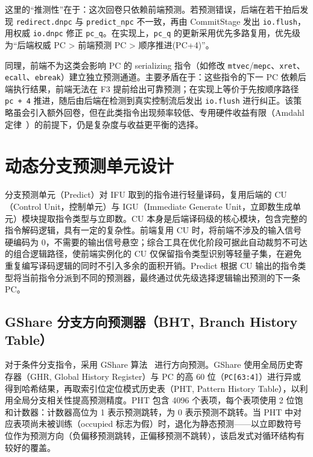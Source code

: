 这里的“推测性”在于：这次回卷只依赖前端预测。若预测错误，后端在若干拍后发现 \lstinline|redirect.dnpc| 与 \lstinline|predict_npc| 不一致，再由 CommitStage 发出 \lstinline|io.flush|，用权威 \lstinline|io.dnpc| 修正 \lstinline|pc_q|。在实现上，\lstinline|pc_q| 的更新采用优先多路复用，优先级为“后端权威 PC > 前端预测 PC > 顺序推进(PC+4)”。

同理，前端不为这类会影响 PC 的 serializing 指令（如修改 \lstinline|mtvec|/\lstinline|mepc|、\lstinline|xret|、\lstinline|ecall|、\lstinline|ebreak|）建立独立预测通道。主要矛盾在于：这些指令的下一 PC 依赖后端执行结果，前端无法在 F3 提前给出可靠预测；在实现上等价于先按顺序路径 \lstinline|pc + 4| 推进，随后由后端在检测到真实控制流后发出 \lstinline|io.flush| 进行纠正。该策略虽会引入额外回卷，但在此类指令出现频率较低、专用硬件收益有限（Amdahl 定律~\cite{amdahl1967validity}）的前提下，仍是复杂度与收益更平衡的选择。

\section{动态分支预测单元设计}\label{sec:predict}

分支预测单元（Predict）对 IFU 取到的指令进行轻量译码，复用后端的 CU（Control Unit，控制单元）与 IGU（Immediate Generate Unit，立即数生成单元）模块提取指令类型与立即数。CU 本身是后端译码级的核心模块，包含完整的指令解码逻辑，具有一定的复杂性。前端复用 CU 时，将前端不涉及的输入信号硬编码为 0，不需要的输出信号悬空；综合工具在优化阶段可据此自动裁剪不可达的组合逻辑路径，使前端实例化的 CU 仅保留指令类型识别等轻量子集，在避免重复编写译码逻辑的同时不引入多余的面积开销。Predict 根据 CU 输出的指令类型将当前指令分派到不同的预测器，最终通过优先级选择逻辑输出预测的下一条 PC。

\subsection{GShare 分支方向预测器（BHT, Branch History Table）}

对于条件分支指令，采用 GShare 算法~\cite{mcfarling1993combining} 进行方向预测。GShare 使用全局历史寄存器（GHR, Global History Register）与 PC 的高 60 位（\lstinline|PC[63:4]|）进行异或得到哈希结果，再取索引位定位模式历史表（PHT, Pattern History Table），以利用全局分支相关性提高预测精度。PHT 包含 4096 个表项，每个表项使用 2 位饱和计数器：计数器高位为 1 表示预测跳转，为 0 表示预测不跳转。当 PHT 中对应表项尚未被训练（occupied 标志为假）时，退化为静态预测——以立即数符号位作为预测方向（负偏移预测跳转，正偏移预测不跳转），该启发式对循环结构有较好的覆盖。


